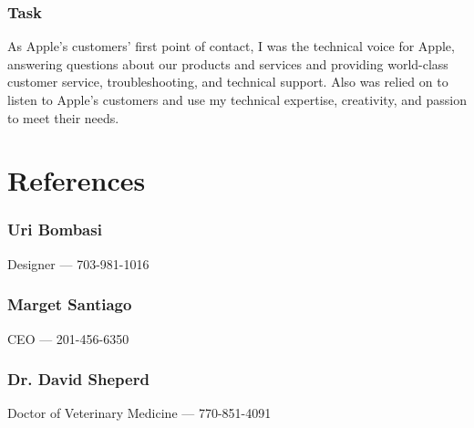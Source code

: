 \documentclass{article}
\begin{document}
\subsubsection{Task}
As Apple's customers’ first point of contact, I was the technical voice for Apple, answering questions about our products and services and providing world-class customer service, troubleshooting, and technical support. Also was relied on to listen to Apple's customers and use my technical expertise, creativity, and passion to meet their needs.
\section{References}
\subsubsection{Uri Bombasi} Designer --- 703-981-1016
\subsubsection{Marget Santiago} CEO --- 201-456-6350
\subsubsection{Dr. David Sheperd} Doctor of Veterinary Medicine --- 770-851-4091
\end{document}
